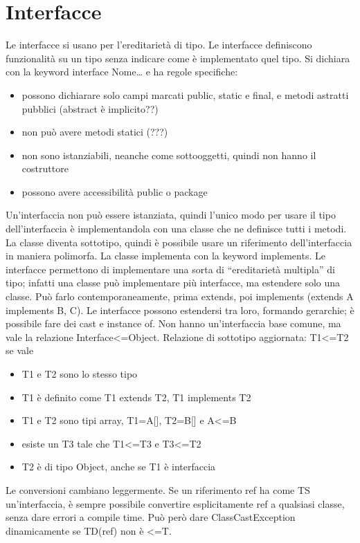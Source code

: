 \section{Interfacce}
Le interfacce si usano per l'ereditarietà di tipo. Le interfacce definiscono funzionalità su un tipo senza indicare come è implementato quel tipo. Si dichiara con la keyword interface Nome{…} e ha regole specifiche:
\begin{itemize}
\item possono dichiarare solo campi marcati public, static e final, e metodi astratti pubblici (abstract è implicito??)
\item non può avere metodi statici (???)
\item non sono istanziabili, neanche come sottooggetti, quindi non hanno il costruttore
\item possono avere accessibilità public o package
\end{itemize}
Un'interfaccia non può essere istanziata, quindi l'unico modo per usare il tipo dell'interfaccia è implementandola con una classe che ne definisce tutti i metodi. La classe diventa sottotipo, quindi è possibile usare un riferimento dell'interfaccia in maniera polimorfa. La classe implementa con la keyword implements. 
Le interfacce permettono di implementare una sorta di “ereditarietà multipla” di tipo; infatti una classe può implementare più interfacce, ma estendere solo una classe. Può farlo contemporaneamente, prima extends, poi implements (extends A implements B, C).
Le interfacce possono estendersi tra loro, formando gerarchie; è possibile fare dei cast e instance of. Non hanno un'interfaccia base comune, ma vale la relazione Interface<=Object.
Relazione di sottotipo aggiornata: T1<=T2 se vale
\begin{itemize}
\item T1 e T2 sono lo stesso tipo
\item T1 è definito come T1 extends T2, T1 implements T2
\item T1 e T2 sono tipi array, T1=A[], T2=B[] e A<=B
\item esiste un T3 tale che T1<=T3 e T3<=T2
\item T2 è di tipo Object, anche se T1 è interfaccia
\end{itemize}

Le conversioni cambiano leggermente. Se un riferimento ref ha come TS un'interfaccia, è sempre possibile convertire esplicitamente ref a qualsiasi classe, senza dare errori a compile time. Può però dare ClassCastException dinamicamente se TD(ref) non è <=T.

